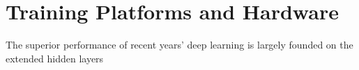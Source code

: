 \section{Training Platforms and Hardware}
The superior performance of recent years' deep learning is largely founded on the extended hidden layers 